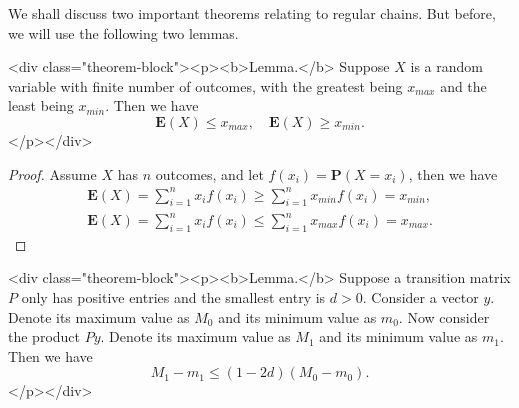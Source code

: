 We shall discuss two important theorems relating to regular chains. But before, we will use the following two lemmas.

<div class="theorem-block"><p><b>Lemma.</b> 
\label{lemma:8.1}
Suppose $X$ is a random variable with finite number of outcomes, with the greatest being $x_{max}$ and the least being $x_{min}$. Then we have 
$$\begin{equation}
    \mathbf{E}(X) \leq x_{max}, \quad \mathbf{E}(X) \geq x_{min}.
\end{equation}$$
</p></div>

\begin{proof}
Assume $X$ has $n$ outcomes, and let $f(x_i) = \mathbf{P}(X = x_i)$, then we have
\begin{gather*}
    \mathbf{E}(X) = \sum_{i=1}^n x_i f(x_i) \geq \sum_{i=1}^n x_{min} f(x_i) = x_{min}, \\
    \mathbf{E}(X) = \sum_{i=1}^n x_i f(x_i) \leq \sum_{i=1}^n x_{max} f(x_i) = x_{max}.
\end{gather*}
\end{proof}

<div class="theorem-block"><p><b>Lemma.</b> 
\label{lemma:8.2}
Suppose a transition matrix $P$ only has positive entries and the smallest entry is $d>0$. Consider a vector $y$. Denote its maximum value as $M_0$ and its minimum value as $m_0$. Now consider the product $Py$. Denote its maximum value as $M_1$ and its minimum value as $m_1$. Then we have
$$\begin{equation}
    M_1 - m_1 \leq (1-2d) (M_0 - m_0).
\end{equation}$$
</p></div>

